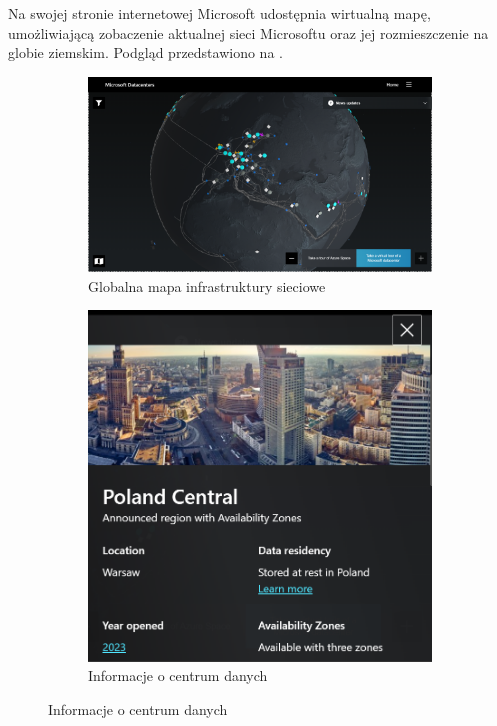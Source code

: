 Na swojej stronie internetowej Microsoft udostępnia wirtualną mapę, umożliwiającą zobaczenie aktualnej sieci Microsoftu oraz jej rozmieszczenie na globie ziemskim. Podgląd przedstawiono na .

\begin{figure}[H]
    \begin{subfigure}[m]{0.6\textwidth}
    \includegraphics[width=\textwidth]{images/azure-ic}
    \caption{Globalna mapa infrastruktury sieciowe}
    \end{subfigure}
    \hfill
    \begin{subfigure}[m]{0.35\textwidth}
        \includegraphics[width=\textwidth]{images/azure-pl}
        \caption{Informacje o centrum danych}
    \end{subfigure}
    \label{fig:azure-ic}
\end{figure}

